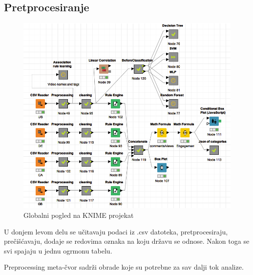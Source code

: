 \documentclass[a4paper]{article}
\theoremstyle{definition}
\begin{document}
\subsection{Pretprocesiranje} \label{pretprocesiranje}

\begin{figure}[H]
\begin{center}
    \includegraphics[width=1\textwidth]{Global.png}
    \caption{Globalni pogled na KNIME projekat}
    \label{fig:global}
\end{center}
\end{figure}

U donjem levom delu se učitavaju podaci iz .csv datoteka, pretprocesiraju, prečišćavaju, dodaje se redovima oznaka na koju državu se odnose.
Nakon toga se svi spajaju u jednu ogrmonu tabelu.

Preprocessing meta-čvor sadrži obrade koje su potrebne za sav dalji tok analize.
\end{document}
